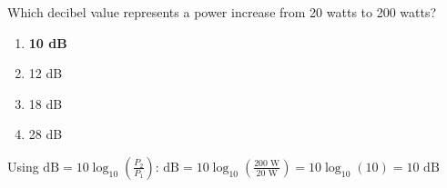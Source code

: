 \begin{tcolorbox}[colback=gray!10!white,colframe=black!75!black,title={T5B11}]
Which decibel value represents a power increase from 20 watts to 200 watts?
\begin{enumerate}[label=\Alph*),noitemsep]
    \item \textbf{10 dB}
    \item 12 dB
    \item 18 dB
    \item 28 dB
\end{enumerate}
\end{tcolorbox}

Using $\text{dB} = 10 \log_{10}(\frac{P_2}{P_1})$:
$\text{dB} = 10 \log_{10}(\frac{200\text{ W}}{20\text{ W}}) = 10 \log_{10}(10) = 10\text{ dB}$
